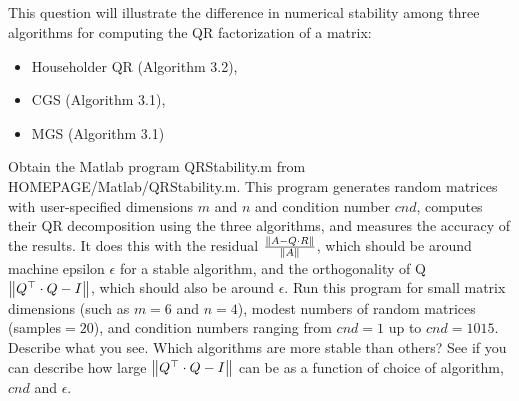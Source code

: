 \documentclass[a4paper]{ctexart}
\newcommand{\pf}{\textbf{\color{pink}{proof:}}}
\begin{document}
\subsection{}
This question will illustrate the difference in numerical
stability among three algorithms for computing the QR factorization
 of a matrix: 
\begin{itemize}
    \item Householder QR (Algorithm 3.2),
    \item CGS (Algorithm 3.1),
    \item MGS (Algorithm 3.1)
\end{itemize}
Obtain the Matlab program QRStability.m from
HOMEPAGE/Matlab/QRStability.m. This program generates random matrices
 with user-specified dimensions $m$ and $n$ and condition number $cnd$, computes
their QR decomposition using the three algorithms, and measures the accuracy
of the results. It does this with the residual $\frac{\norm{A - Q \cdot R}}{\norm{A}}$, which should be
around machine epsilon $\epsilon$ for a stable algorithm, and the orthogonality of Q
$\norm{Q^\top \cdot Q - I}$, which should also be around $\epsilon$. Run this program for small matrix
 dimensions (such as $m= 6$ and $n= 4$), modest numbers of random matrices
(samples$= 20$), and condition numbers ranging from $cnd= 1$ up to $cnd= 1015$.
Describe what you see. Which algorithms are more stable than others? See
if you can describe how large $\norm{Q^\top \cdot Q - I}$ can be as a function of choice of
algorithm, $cnd$ and $\epsilon$.

\pf
\end{document}
